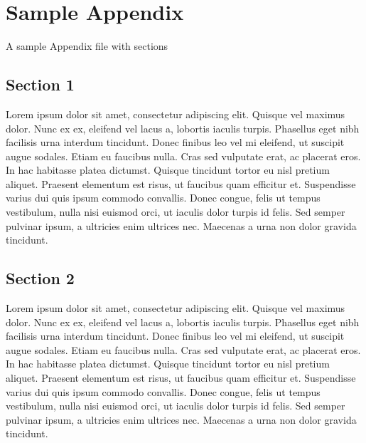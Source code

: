 \chapter{Sample Appendix}
\label{chp:LabelForAppendix}

A sample Appendix file with sections
\section{Section 1}
Lorem ipsum dolor sit amet, consectetur adipiscing elit. Quisque vel maximus dolor. Nunc ex ex, eleifend vel lacus a, lobortis iaculis turpis. Phasellus eget nibh facilisis urna interdum tincidunt. Donec finibus leo vel mi eleifend, ut suscipit augue sodales. Etiam eu faucibus nulla. Cras sed vulputate erat, ac placerat eros. In hac habitasse platea dictumst. Quisque tincidunt tortor eu nisl pretium aliquet. Praesent elementum est risus, ut faucibus quam efficitur et. Suspendisse varius dui quis ipsum commodo convallis. Donec congue, felis ut tempus vestibulum, nulla nisi euismod orci, ut iaculis dolor turpis id felis. Sed semper pulvinar ipsum, a ultricies enim ultrices nec. Maecenas a urna non dolor gravida tincidunt.

\section{Section 2}
Lorem ipsum dolor sit amet, consectetur adipiscing elit. Quisque vel maximus dolor. Nunc ex ex, eleifend vel lacus a, lobortis iaculis turpis. Phasellus eget nibh facilisis urna interdum tincidunt. Donec finibus leo vel mi eleifend, ut suscipit augue sodales. Etiam eu faucibus nulla. Cras sed vulputate erat, ac placerat eros. In hac habitasse platea dictumst. Quisque tincidunt tortor eu nisl pretium aliquet. Praesent elementum est risus, ut faucibus quam efficitur et. Suspendisse varius dui quis ipsum commodo convallis. Donec congue, felis ut tempus vestibulum, nulla nisi euismod orci, ut iaculis dolor turpis id felis. Sed semper pulvinar ipsum, a ultricies enim ultrices nec. Maecenas a urna non dolor gravida tincidunt.


